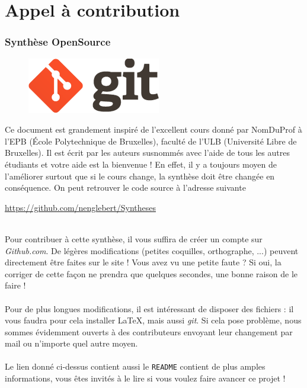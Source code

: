 \chapter*{Appel à contribution}
\subsection*{Synthèse OpenSource}
\begin{figure}
	\includegraphics[scale=0.5]{git.png}
\end{figure}
Ce document est grandement inspiré de l’excellent cours donné 
par NomDuProf à l’EPB (École Polytechnique de Bruxelles), faculté de l’ULB (Université 
Libre de Bruxelles). Il est écrit par les auteurs susnommés avec l’aide de tous les autres étudiants 
et votre aide est la bienvenue ! En effet, il y a toujours moyen de l’améliorer surtout que si le 
cours change, la synthèse doit être changée en conséquence. On peut retrouver le code source à l’adresse 
suivante
\begin{center}
	\url{https://github.com/nenglebert/Syntheses}
\end{center}\ \\
Pour contribuer à cette synthèse, il vous suffira de créer un compte sur \textit{Github.com}. De
légères modifications (petites coquilles, orthographe, ...) peuvent directement être faites sur le
site ! Vous avez vu une petite faute ? Si oui, la corriger de cette façon ne prendra que quelques 
secondes, une bonne raison de le faire ! \\
\\
Pour de plus longues modifications, il est intéressant de disposer des fichiers : il vous 
faudra pour cela installer \LaTeX, mais aussi \textit{git}. Si cela pose problème, nous sommes 
évidemment ouverts à des contributeurs envoyant leur changement par mail ou n’importe quel autre 
moyen.\\
\\
Le lien donné ci-dessus contient aussi le \texttt{README} contient de plus amples informations, 
vous êtes invités à le lire si vous voulez faire avancer ce projet ! 

